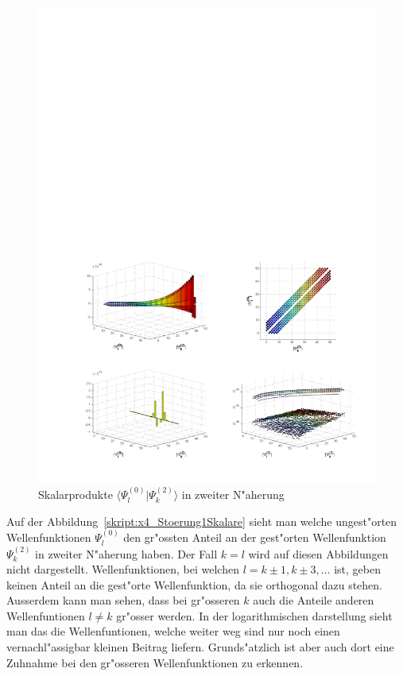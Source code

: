 \begin{refsection}
\begin{figure}[h]	%
\centering
\includegraphics[width=1.0\textwidth]{anharmonisch/images/x4/Stoerung2Skalare.pdf}
\caption{Skalarprodukte $\langle\Psi_l^{(0)}|\Psi_k^{(2)}\rangle$ in zweiter N"aherung
\label{skript:x4_Stoerung2Skalare}}
\end{figure}

Auf der Abbildung~\ref{skript:x4_Stoerung1Skalare} sieht man welche ungest"orten Wellenfunktionen $\Psi_l^{(0)}$ den gr"ossten Anteil an der gest"orten Wellenfunktion $\Psi_k^{(2)}$ in zweiter N"aherung haben. Der Fall $k=l$ wird auf diesen Abbildungen nicht dargestellt. Wellenfunktionen, bei welchen $l=k\pm 1,k\pm 3,\dots$ ist, geben keinen Anteil an die gest"orte Wellenfunktion, da sie orthogonal dazu stehen. Ausserdem kann man sehen, dass bei gr"osseren $k$ auch die Anteile anderen Wellenfuntionen $l\neq k$ gr"osser werden. In der logarithmischen darstellung sieht man das die Wellenfuntionen, welche weiter weg sind nur noch einen vernachl"assigbar kleinen Beitrag liefern. Grunds"atzlich ist aber auch dort eine Zuhnahme bei den gr"osseren Wellenfunktionen zu erkennen.

\printbibliography[heading=subbibliography]
\end{refsection}

